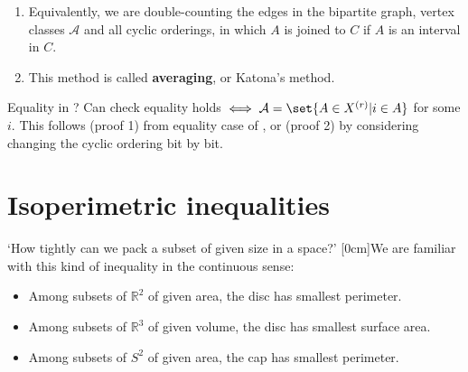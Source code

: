 \documentclass{article}
\newcommand{\A}{\mathcal{A}}
\newcommand{\named}[1]{\textbf{#1}\index{#1}}
\begin{document}
\begin{remark}\leavevmode
  \begin{enumerate}
    \item Equivalently, we are double-counting the edges in the bipartite graph, vertex classes $\A$ and all cyclic orderings, in which $A$ is joined to $C$ if $A$ is an interval in $C$.
    \item This method is called \named{averaging}, or Katona's method.
  \end{enumerate}
\end{remark}
Equality in ? Can check equality holds $\iff \A = \set{A \in X^{(r)} | i \in A}$ for some $i$.
This follows (proof 1) from equality case of , or (proof 2) by considering changing the cyclic ordering bit by bit.
\clearpage
\section{Isoperimetric inequalities}
`How tightly can we pack a subset of given size in a space?'
[0cm]We are familiar with this kind of inequality in the continuous sense:
\begin{itemize}
  \item Among subsets of $\mathbb{R}^2$ of given area, the disc has smallest perimeter.
  \item Among subsets of $\mathbb{R}^3$ of given volume, the disc has smallest surface area.
  \item Among subsets of $S^2$ of given area, the cap has smallest perimeter.
\end{itemize}

\begin{center}
\end{center}
\end{document}
